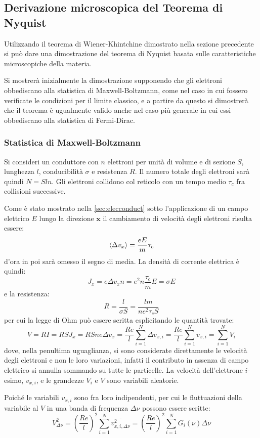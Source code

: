 \subsection{Derivazione microscopica del Teorema di Nyquist}

Utilizzando il teorema di Wiener-Khintchine dimostrato nella sezione precedente si può dare una dimostrazione del teorema di Nyquist basata sulle caratteristiche microscopiche della materia.

Si mostrerà inizialmente la dimostrazione supponendo che gli elettroni obbediscano alla statistica di Maxwell-Boltzmann, come nel caso in cui fossero verificate le condizioni per il limite classico, e a partire da questo si dimostrerà che il teorema è ugualmente valido anche nel caso più generale in cui essi obbediscano alla statistica di Fermi-Dirac.

\subsubsection{Statistica di Maxwell-Boltzmann}
Si consideri un conduttore con $ n $ elettroni per unità di volume e di sezione $ S $, lunghezza $ l $, conducibilità $ \sigma $ e resistenza $ R $. Il numero totale degli elettroni sarà quindi $ N = S l n $. Gli elettroni collidono col reticolo con un tempo medio $ \tau_c $ fra collisioni successive.

Come è stato mostrato nella \cref{sec:elecconduct} sotto l'applicazione di un campo elettrico $ E $ lungo la direzione $ \textbf{x} $ il cambiamento di velocità degli elettroni risulta essere:
\[ \expval{\Delta v_x} = \frac{e E}{m} \tau_c \]
d'ora in poi sarà omesso il segno di media.
La densità di corrente elettrica è quindi:
\[ J_x = e \Delta v_x n = e^2 n \frac{ \tau_c}{m} E = \sigma E\]
e la resistenza:
\[ R = \frac{l}{\sigma S} = \frac{lm}{n e^2 \tau_c S} \]
per cui la legge di Ohm può essere scritta esplicitando le quantità trovate:
\[ V = RI = R S J_x = R S n e \Delta v_x = \frac{R e}{l} \sum_{i=1}^{N} \Delta v_{x,i} = \frac{R e}{l} \sum_{i=1}^{N} v_{x,i} = \sum_{i=1}^{N} V_{i} \]
dove, nella penultima uguaglianza, si sono considerate direttamente le velocità degli elettroni e non le loro variazioni, infatti il contributo in assenza di campo elettrico si annulla sommando su tutte le particelle. La velocità dell'elettrone $ i $-esimo, $ v_{x,i} $, e le grandezze $ V_i $ e $ V $ sono variabili aleatorie.

Poiché le variabili $ v_{x,i} $ sono fra loro indipendenti, per cui le fluttuazioni della variabile al $ V $ in una banda di frequenza $ \Delta \nu $ possono essere scritte:
\[ \overline{V_{\Delta \nu}^2} = \left(\frac{R e}{l}\right)^2 \sum_{i=1}^{N} \overline{v_{x,i,\Delta \nu}^2} = \left(\frac{R e}{l}\right)^2 \sum_{i=1}^{N} G_i(\nu) \Delta \nu\]

